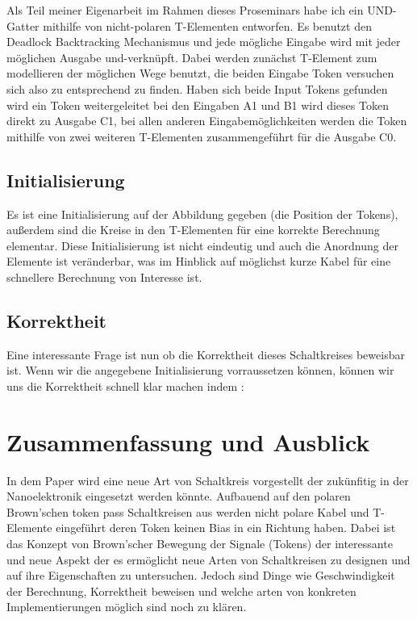 \documentclass[11pt,a4paper]{article}
\begin{document}
Als Teil meiner Eigenarbeit im Rahmen dieses Proseminars habe ich ein UND-Gatter
mithilfe von nicht-polaren T-Elementen entworfen.
%
Es benutzt den Deadlock Backtracking Mechanismus und jede 
mögliche Eingabe wird mit jeder möglichen Ausgabe und-verknüpft. 
%
Dabei werden zunächst T-Element zum modellieren der möglichen Wege benutzt,
die beiden Eingabe Token versuchen sich also zu entsprechend zu finden.
%
Haben sich beide Input Tokens gefunden wird ein Token weitergeleitet bei 
den Eingaben A1 und B1 wird dieses Token direkt zu Ausgabe C1, bei allen 
anderen Eingabemöglichkeiten werden die Token mithilfe von zwei weiteren 
T-Elementen zusammengeführt für die Ausgabe C0.


\subsection{Initialisierung}
Es ist eine Initialisierung auf der Abbildung gegeben (die Position der Tokens), 
außerdem sind die Kreise in den T-Elementen für eine korrekte Berechnung
elementar.
%
Diese Initialisierung ist nicht eindeutig und auch die Anordnung der
Elemente ist veränderbar, was im Hinblick auf möglichst kurze Kabel 
für eine schnellere Berechnung von Interesse ist.

\subsection{Korrektheit}
Eine interessante Frage ist nun ob die Korrektheit dieses Schaltkreises
beweisbar ist. Wenn wir die angegebene Initialisierung vorraussetzen können,
können wir uns die Korrektheit schnell klar machen indem :



\section{Zusammenfassung und Ausblick}
In dem Paper \cite{Peper_nonPolar_2018} wird eine neue Art
von Schaltkreis vorgestellt der zukünfitig in der Nanoelektronik eingesetzt
werden könnte.
%
Aufbauend auf den polaren Brown'schen token pass Schaltkreisen aus 
\cite{Peper_Fundamentals_2013} werden nicht polare Kabel und T-Elemente 
eingeführt deren Token keinen Bias in ein Richtung haben. 
%
Dabei ist das Konzept von Brown'scher Bewegung der Signale (Tokens) 
der interessante und neue Aspekt der es ermöglicht neue Arten von Schaltkreisen 
zu designen und auf ihre Eigenschaften zu untersuchen.
%
Jedoch sind Dinge wie Geschwindigkeit der Berechnung, Korrektheit beweisen und 
welche arten von konkreten Implementierungen möglich sind noch zu klären.
\end{document}
